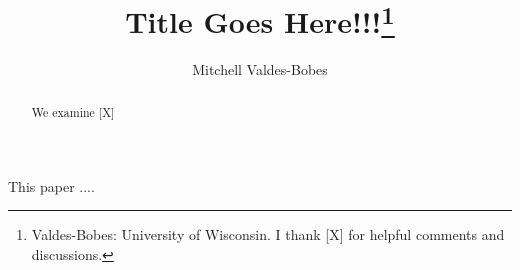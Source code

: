 \documentclass[12pt]{article}
\begin{document}
\title{Title Goes Here!!!\thanks{Valdes-Bobes: University of Wisconsin.
		I thank [X] for helpful comments and discussions.}}
\author{Mitchell Valdes-Bobes}
\maketitle
\begin{abstract}
	We examine [X]
\end{abstract}
\thispagestyle{empty}

\pagebreak{}
This paper .... 







	

\end{document}
